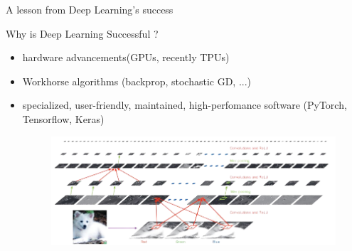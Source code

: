 \begin{frame}{A lesson from Deep Learning's success}
	\begin{Large}
		Why is Deep Learning \alert{Successful} ? 
	\end{Large}

	\begin{itemize}
		\item hardware advancements(GPUs, recently TPUs)
		\item Workhorse algorithms (backprop, stochastic GD, ...)
		\item specialized, user-friendly, maintained, high-perfomance software (PyTorch, Tensorflow, Keras)
		
		\begin{figure}[h]
			\includegraphics[width=\linewidth]{backprop}
		\end{figure}
	\end{itemize}	
\end{frame}

